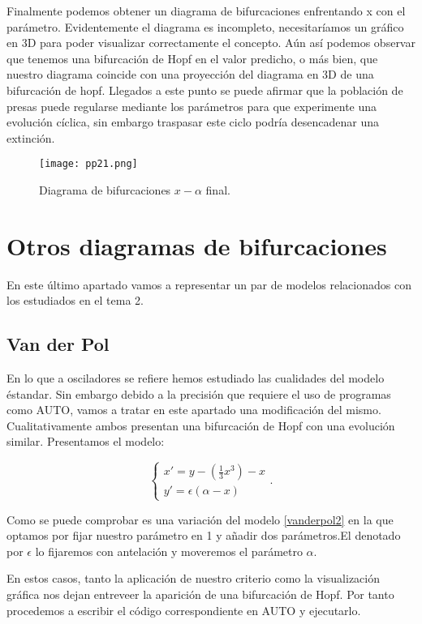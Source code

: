  Finalmente podemos obtener un diagrama de bifurcaciones enfrentando x con el parámetro.
 Evidentemente el diagrama es incompleto, necesitaríamos un gráfico en 3D para poder visualizar correctamente el concepto. Aún así podemos observar que tenemos una bifurcación de Hopf en el valor predicho, o más bien, que nuestro diagrama coincide con una proyección del diagrama en 3D de una bifurcación de hopf. Llegados a este punto se puede afirmar que la población de presas puede regularse mediante los parámetros para que experimente una evolución cíclica, sin embargo traspasar este ciclo podría desencadenar una extinción.
  \begin{figure}[h]
  	\texttt{[image: pp21.png]}
  	\caption{Diagrama de bifurcaciones $x-\alpha$ final.}
  \end{figure}
  
\section{Otros diagramas de bifurcaciones}

En este último apartado vamos a representar un par de modelos relacionados con los estudiados en el tema 2.

\subsection{Van der Pol}

En lo que a osciladores se refiere hemos estudiado las cualidades del modelo éstandar. Sin embargo debido a la precisión que requiere el uso de programas como AUTO, vamos a tratar en este apartado una modificación del mismo. Cualitativamente ambos presentan una bifurcación de Hopf con una evolución similar.
Presentamos el modelo:

\begin{equation}
\left \{ \begin{matrix} x'=y-(\frac{1}{3}x^3)-x\\ y'=\epsilon(\alpha-x)\end{matrix}\right . .
\end{equation}  

Como se puede comprobar es una variación del modelo \ref{vanderpol2} en la que optamos por fijar nuestro parámetro en 1 y añadir dos parámetros.El denotado por $\epsilon$ lo fijaremos con antelación y moveremos el parámetro $\alpha$. 

En estos casos, tanto la aplicación de nuestro criterio como la visualización gráfica nos dejan entreveer la aparición de una bifurcación de Hopf.
Por tanto procedemos a escribir el código correspondiente en AUTO y ejecutarlo.

